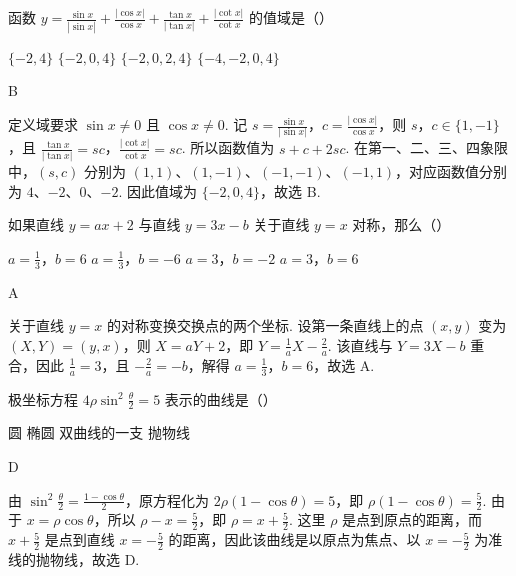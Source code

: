 \documentclass[UTF8,a4paper,oneside,11pt]{ctexbook}
\begin{document}
\begin{problem}
函数 \(y=\frac{\sin x}{\left| \sin x \right|}+\frac{\left| \cos x \right|}{\cos x}+\frac{\tan x}{\left| \tan x \right|}+\frac{\left| \cot x \right|}{\cot x}\) 的值域是（\quad）

\choices
    {\(\{-2,4\}\)}
    {\(\{-2,0,4\}\)}
    {\(\{-2,0,2,4\}\)}
    {\(\{-4,-2,0,4\}\)}

\begin{answer}
B
\end{answer}

\begin{solution}
定义域要求 \(\sin x\neq0\) 且 \(\cos x\neq0\). 记 \(s=\frac{\sin x}{\lvert\sin x\rvert}\)，\(c=\frac{\lvert\cos x\rvert}{\cos x}\)，则 \(s\)，\(c\in\{1,-1\}\)，且 \(\frac{\tan x}{\lvert\tan x\rvert}=sc\)，\(\frac{\lvert\cot x\rvert}{\cot x}=sc\). 所以函数值为 \(s+c+2sc\). 在第一、二、三、四象限中，\((s,c)\) 分别为 \((1,1)\)、\((1,-1)\)、\((-1,-1)\)、\((-1,1)\)，对应函数值分别为 \(4\)、\(-2\)、\(0\)、\(-2\). 因此值域为 \(\{-2,0,4\}\)，故选 B.
\end{solution}
\end{problem}

\begin{problem}
如果直线 \(y=ax+2\) 与直线 \(y=3x-b\) 关于直线 \(y=x\) 对称，那么（\quad）

\choices
    {\(a=\frac{1}{3}\)，\(b=6\)}
    {\(a=\frac{1}{3}\)，\(b=-6\)}
    {\(a=3\)，\(b=-2\)}
    {\(a=3\)，\(b=6\)}

\begin{answer}
A
\end{answer}

\begin{solution}
关于直线 \(y=x\) 的对称变换交换点的两个坐标. 设第一条直线上的点 \((x,y)\) 变为 \((X,Y)=(y,x)\)，则 \(X=aY+2\)，即 \(Y=\frac{1}{a}X-\frac{2}{a}\). 该直线与 \(Y=3X-b\) 重合，因此 \(\frac{1}{a}=3\)，且 \(-\frac{2}{a}=-b\)，解得 \(a=\frac{1}{3}\)，\(b=6\)，故选 A.
\end{solution}
\end{problem}

\begin{problem}
极坐标方程 \(4\rho\sin^2\frac{\theta}{2}=5\) 表示的曲线是（\quad）

\choices
    {圆}
    {椭圆}
    {双曲线的一支}
    {抛物线}

\begin{answer}
D
\end{answer}

\begin{solution}
由 \(\sin^2\frac{\theta}{2}=\frac{1-\cos\theta}{2}\)，原方程化为 \(2\rho(1-\cos\theta)=5\)，即 \(\rho(1-\cos\theta)=\frac{5}{2}\). 由于 \(x=\rho\cos\theta\)，所以 \(\rho-x=\frac{5}{2}\)，即 \(\rho=x+\frac{5}{2}\). 这里 \(\rho\) 是点到原点的距离，而 \(x+\frac{5}{2}\) 是点到直线 \(x=-\frac{5}{2}\) 的距离，因此该曲线是以原点为焦点、以 \(x=-\frac{5}{2}\) 为准线的抛物线，故选 D.
\end{solution}
\end{problem}
\end{document}
